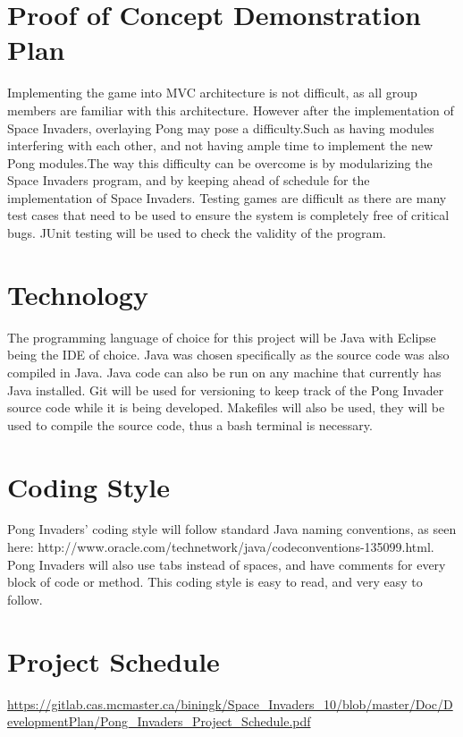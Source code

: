 \documentclass{article}
\begin{document}
\section{Proof of Concept Demonstration Plan}

Implementing the game into MVC architecture is not difficult, as all group members are familiar with this architecture. However after the implementation of Space Invaders, overlaying Pong may pose a difficulty.Such as having modules interfering with each other, and not having ample time to implement the new Pong modules.The way this difficulty can be overcome is by modularizing the Space Invaders program, and by keeping ahead of schedule for the implementation of Space Invaders. Testing games are difficult as there are many test cases that need to be used to ensure the system is completely free of critical bugs. JUnit testing will be used to check the validity of the program. 

\section{Technology}
\indent The programming language of choice for this project will be Java with Eclipse being the IDE of choice. Java was chosen specifically as the source code was also compiled in Java. Java code can also be run on any machine that currently has Java installed. Git will be used for versioning to keep track of the Pong Invader source code while it is being developed. Makefiles will also be used, they will be used to compile the source code, thus a bash terminal is necessary.
\section{Coding Style}
\indent Pong Invaders’ coding style will follow standard Java naming conventions, as seen here: http://www.oracle.com/technetwork/java/codeconventions-135099.html. Pong Invaders will also use tabs instead of spaces, and have comments for every block of code or method. This coding style is easy to read, and very easy to follow.
\section{Project Schedule}
\url {https://gitlab.cas.mcmaster.ca/biningk/Space_Invaders_10/blob/master/Doc/DevelopmentPlan/Pong_Invaders_Project_Schedule.pdf}
\newpage
\end{document}
